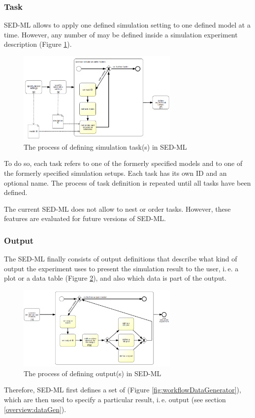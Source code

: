 \subsubsection{Task}
\label{overview:task}
SED-ML allows to apply one defined simulation setting to one defined model at a time. However, any number of  may be defined inside a simulation experiment description (Figure \ref{fig:workflowTask}). 
%
\begin{figure}[h]
\centering
\includegraphics[width=0.7\textwidth]{images/bpmn/sedTaskOryx.png}
\caption{The process of defining simulation task(s) in SED-ML}
\label{fig:workflowTask}
\end{figure}
%
To do so, each task refers to one of the formerly specified models and to one of the formerly specified simulation setups. Each task has its own ID and an optional name. The process of task definition is repeated until all tasks have been defined.


The current SED-ML does not allow to nest or order tasks. However, these features are evaluated for future versions of SED-ML.

\subsubsection{Output}
\label{overview:output}
The SED-ML finally consists of output definitions that describe what kind of output the experiment uses to present the simulation result to the user, i.\,e. a plot or a data table (Figure \ref{fig:workflowOutput}), and also which data is part of the output. 
%
\begin{figure}[h]
\centering
\includegraphics[width=0.7\textwidth]{images/bpmn/sedOutputOryx.png}
\caption{The process of defining output(s) in SED-ML}
\label{fig:workflowOutput}
\end{figure}
%
Therefore, SED-ML first defines a set of  (Figure \ref{fig:workflowDataGenerator}), which are then used to specify a particular result, i.\,e. output (see section \ref{overview:dataGen}). 

